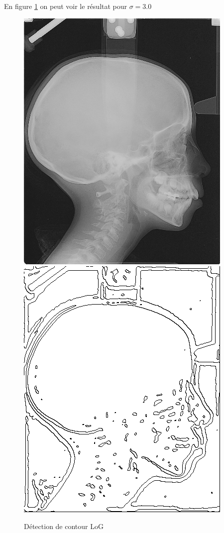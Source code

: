 \documentclass[paper=a4, fontsize=11pt]{scrartcl} %
\begin{document}
En figure \ref{Logavap} on peut voir le résultat pour $\sigma=3.0$

\begin{figure}
\centering
\caption{Détection de contour LoG}
\label{Logavap}
\includegraphics[scale=0.5]{images/rapport/radio1.png} 
\includegraphics[scale=0.5]{images/rapport/coucou2.png}
\end{figure}
\end{document}
